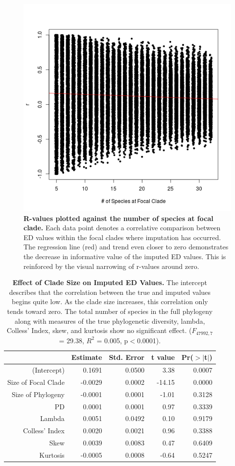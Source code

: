 \documentclass[12pt,english]{article}
\begin{document}
\begin{figure}[!ht]
  \center
  \includegraphics[width=.5\textwidth]{edModel.png}
  \caption{\textbf{R-values plotted against the number of species at focal
  clade.} Each data point denotes a correlative comparison between ED values
  within the focal clades where imputation has occurred. The regression line
  (red) and trend even closer to zero demonstrates the decrease in informative
  value of the imputed ED values. This is reinforced by the visual narrowing of
  r-values around zero.}
  \label{imputationTrend}
\end{figure}

\begin{table}[ht] 
\centering
\begin{tabular}{rrrrr}
  \hline
  & Estimate & Std. Error & t value & Pr($>$$|$t$|$) \\
   \hline
   (Intercept) & 0.1691 & 0.0500 & 3.38 & 0.0007 \\
   Size of Focal Clade & -0.0029 & 0.0002 & -14.15 & 0.0000 \\
   Size of Phylogeny & -0.0001 & 0.0001 & -1.01 & 0.3128 \\
   PD & 0.0001 & 0.0001 & 0.97 & 0.3339 \\
   Lambda & 0.0051 & 0.0492 & 0.10 & 0.9179 \\
   Colless' Index & 0.0020 & 0.0021 & 0.96 & 0.3388 \\
   Skew & 0.0039 & 0.0083 & 0.47 & 0.6409 \\
   Kurtosis & -0.0005 & 0.0008 & -0.64 & 0.5247 \\
   \hline
   \hline
\end{tabular}
\caption{\textbf{Effect of Clade Size on Imputed ED Values.} The
intercept describes that the correlation between the true and imputed values
begins quite low. As the clade size increases, this correlation only tends
toward zero. The total number of species in the full phylogeny along with
measures of the true phylogenetic diversity, lambda, Colless' Index, skew, and
kurtosis show no significant effect. ($F_{47992, 7}$ = 29.38, $R^{2}$ = 0.005,
p$<$0.0001).}
\label{imputeReg}
\end{table}
\end{document}
